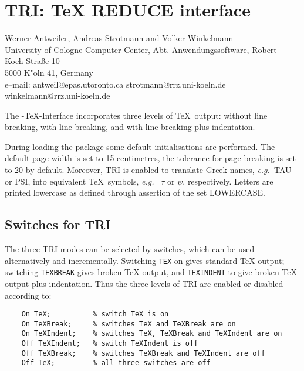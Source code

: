 \chapter{TRI: TeX REDUCE interface}
\label{TRI}

{\footnotesize
\begin{center}
Werner Antweiler, Andreas Strotmann and Volker Winkelmann \\
University of Cologne Computer Center,
Abt. Anwendungssoftware, Robert-Koch-Stra\ss{e} 10 \\
5000 K"oln 41, Germany \\[0.05in]
e--mail: antweil@epas.utoronto.ca strotmann@rrz.uni-koeln.de winkelmann@rrz.uni-koeln.de
\end{center}
}

The \REDUCE-\TeX-Interface incorporates three
levels of \TeX\ output: without line breaking, with line breaking,
and with line breaking plus indentation.

During loading the package some default initialisations are performed.
The default page width is set to 15 centimetres, the tolerance for
page breaking is set to 20 by default.  Moreover, TRI is enabled 
to translate Greek names, {\em e.g.\ }TAU or PSI, into equivalent \TeX\
symbols, {\em e.g.\ } $\tau$ or $\psi$, respectively.  Letters are
printed lowercase as defined through assertion of the set
LOWERCASE.

\section{Switches for TRI}

The three TRI modes can be selected by switches, which can be used
alternatively and incrementally.  Switching {\tt TEX}\ttindex{TEX} on
gives standard \TeX-output; switching {\tt TEXBREAK}\ttindex{TEXBREAK}
gives broken \TeX-output, and {\tt TEXINDENT}\ttindex{TEXINDENT} to
give broken  \TeX-output plus indentation.  Thus the three levels of
TRI are enabled or disabled according to: 
\begin{verbatim}
    On TeX;          % switch TeX is on
    On TeXBreak;     % switches TeX and TeXBreak are on
    On TeXIndent;    % switches TeX, TeXBreak and TeXIndent are on
    Off TeXIndent;   % switch TeXIndent is off
    Off TeXBreak;    % switches TeXBreak and TeXIndent are off
    Off TeX;         % all three switches are off
\end{verbatim}

